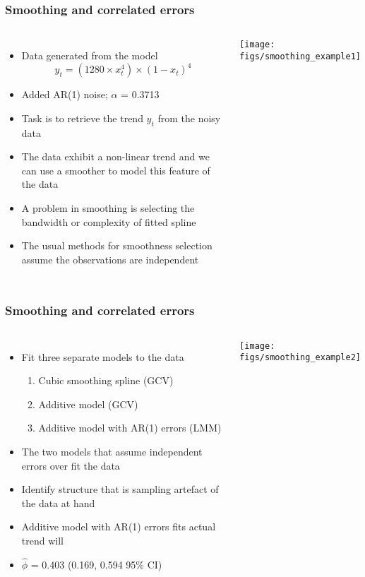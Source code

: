 \documentclass{beamer}
\begin{document}
\begin{frame}
\frametitle{Smoothing and correlated errors}
\small
\begin{columns}
    \column{6cm}
    \begin{itemize}
        \item Data generated from the model
        $$y_t = (1280 \times x_t^4) \times (1 - x_t)^4$$
        \item Added AR(1) noise; $\alpha$ = 0.3713
        \item Task is to retrieve the trend $y_t$ from the noisy data
        \item The data exhibit a non-linear trend and we can use a smoother to model this feature of the data
        \item A problem in smoothing is selecting the bandwidth or complexity of fitted spline
        \item The usual methods for smoothness selection assume the observations are independent
    \end{itemize}

    \column{6cm}
    \texttt{[image: figs/smoothing\_example1]}
\end{columns}
\normalsize
\end{frame}

\begin{frame}
\frametitle{Smoothing and correlated errors}
\small
\begin{columns}
    \column{6cm}
    \begin{itemize}
        \item Fit three separate models to the data
        \begin{enumerate}
            \item Cubic smoothing spline (GCV)
            \item Additive model (GCV)
            \item Additive model with AR(1) errors (LMM)
        \end{enumerate}
        \item The two models that assume independent errors over fit the data
        \item Identify structure that is sampling artefact of the data at hand
        \item Additive model with AR(1) errors fits actual trend will
        \item $\hat{\phi}$ = 0.403 (0.169, 0.594 95\% CI)
    \end{itemize}

    \column{6cm}
    \texttt{[image: figs/smoothing\_example2]}
\end{columns}
\normalsize
\end{frame}
\end{document}
